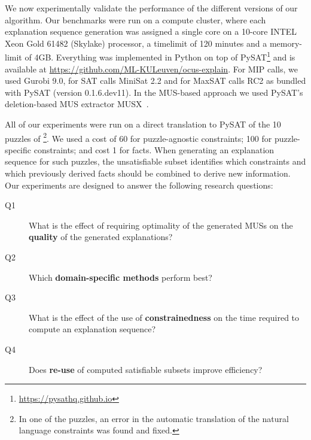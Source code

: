 
We now experimentally validate the performance of the different versions of our algorithm.
Our benchmarks were run on a compute cluster, where each explanation sequence generation was assigned a single core on a 10-core INTEL Xeon Gold 61482 (Skylake) processor, a timelimit of 120 minutes and a memory-limit of 4GB. 
Everything was implemented in Python on top of PySAT\footnote{\url{https://pysathq.github.io}} and is available at \url{https://github.com/ML-KULeuven/ocus-explain}. 
For MIP calls, we used Gurobi 9.0, for SAT calls MiniSat 2.2 and for MaxSAT calls RC2 as bundled with PySAT (version 0.1.6.dev11). In the MUS-based approach we used PySAT's deletion-based MUS extractor MUSX~\cite{marques2010minimal}.

All of our experiments were run on a direct translation to PySAT of the 10 puzzles of \citet{ecai/BogaertsGCG20}\footnote{In one of the puzzles, an error in the automatic translation of the natural language constraints was found and fixed.}. %
We used a cost of 60 for puzzle-agnostic constraints; 100 for puzzle-specific constraints; and cost 1 for facts.
When generating an explanation sequence for such puzzles, the unsatisfiable subset identifies which constraints and which previously derived facts should be combined to derive new information. 
%
Our experiments are designed to answer the following research questions: 
\begin{description}
 \item[Q1] What is the effect of requiring optimality of the generated MUSs on the \textbf{quality} of the generated explanations? 
 \item[Q2] Which \textbf{domain-specific \grow methods} perform best?
 \item[Q3] What is the effect of the use of \textbf{constrainedness} on the time required to compute an explanation sequence?
 \item[Q4] Does \textbf{re-use} of computed satisfiable subsets improve efficiency?
\end{description}



